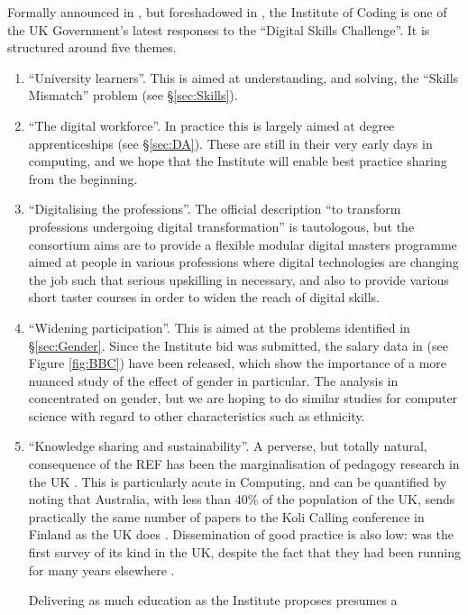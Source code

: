 \documentclass[sigconf,anonymous]{acmart}
\begin{document}
Formally announced in \cite{DfE2018a}, but foreshadowed in
\cite{HMG2015a}, the Institute of Coding is one of the UK Government's latest responses to the ``Digital Skills Challenge''. It is structured around five themes.
\begin{enumerate}
\item ``University learners''. This is aimed at understanding, and solving, the ``Skills Mismatch'' problem (see \S\ref{sec:Skills}).
\item ``The digital workforce''. In practice this is largely aimed at degree apprenticeships (see \S\ref{sec:DA}). These are still in their very early days in computing, and we hope that the Institute will enable best practice sharing from the beginning.
\item ``Digitalising the professions''.  The official description ``to transform professions undergoing digital transformation'' \cite{DfE2018a} is tautologous, but the consortium aims are to provide a flexible modular digital masters programme aimed at people in various professions where digital technologies are changing the job such that serious upskilling in necessary, and also  to provide various short taster courses in order to widen the reach of digital skills.
\item ``Widening participation''. This is aimed at the problems identified in \S\ref{sec:Gender}. Since the Institute bid was submitted, the salary data in \cite{DfE2018d} (see Figure \ref{fig:BBC}) have been released, which show the importance of a more nuanced study of the effect of gender in particular. The analysis in \cite{DfE2018d} concentrated on gender, but we are hoping to do similar studies for computer science with regard to other characteristics such as ethnicity.
\item ``Knowledge sharing and sustainability''. A perverse, but totally natural, consequence of the REF has been the marginalisation of pedagogy research in the UK \cite{Cottonetal2018a}. This is particularly acute in Computing, and can be quantified by noting that Australia, with less than 40\%  of the population of the UK, sends practically the same number of papers to the Koli Calling conference in Finland as the UK does \cite{Simon2016a}. Dissemination of good practice is also low: \cite{murphy-et-al:programming2017} was the first survey of its kind in the UK, despite the fact that they had been running for many years elsewhere \cite{simon-et-al:sigcse2018}. 
\par
Delivering as much education as the Institute proposes presumes a

\end{enumerate}
\end{document}
